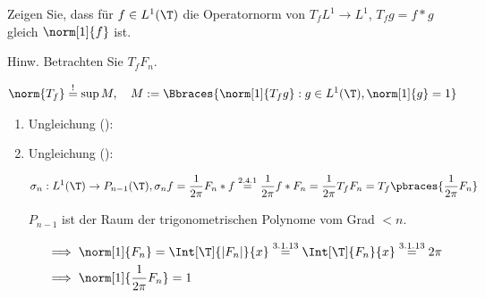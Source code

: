
\begin{exercise}

Zeigen Sie, dass für $f \in L^1(\T)$ die Operatornorm von $T_f L^1 \to L^1$, $T_f g = f \ast g$ gleich $\norm[1]{f}$ ist.

Hinw.
Betrachten Sie $T_f F_n$.

\end{exercise}


\begin{solution}

\phantom{}

\begin{align*}
    \norm{T_f}
    \stackrel{!}{=}
    \sup M,
    \quad
    M
    :=
    \Bbraces
    {
        \norm[1]{T_f g}:
        g \in L^1(\T),
        \norm[1]{g} = 1
    }
\end{align*}

\begin{enumerate}[label = \arabic*.]

    \item Ungleichung (\Quote{$\leq$}):


    \item Ungleichung (\Quote{$\geq$}):
    

    \begin{align*}
        \sigma_n:
        L^1(\T) \to P_{n-1}(\T),
        \sigma_n f
        =
        \frac{1}{2 \pi}
        F_n \ast f
        \stackrel
        {
            \mathrm{2.4.1}
        }{=}
        \frac{1}{2 \pi}
        f \ast F_n
        =
        \frac{1}{2 \pi}
        T_f F_n
        =
        T_f
        \pbraces
        {
            \frac{1}{2 \pi}
            F_n
        }
    \end{align*}

    $P_{n-1}$ ist der Raum der trigonometrischen Polynome vom Grad $< n$.


    \begin{align*}
        & \implies
        \norm[1]{F_n}
        =
        \Int[\T]{|F_n|}{x}
        \stackrel
        {
            \mathrm{3.1.13}
        }{=}
        \Int[\T]{F_n}{x}        
        \stackrel
        {
            \mathrm{3.1.13}
        }{=}
        2 \pi \\
        & \implies
        \norm[1]
        {
            \frac{1}{2 \pi}
            F_n
        }
        =
        1
    \end{align*}
    

\end{enumerate}
\end{solution}
